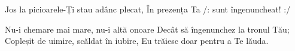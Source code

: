 \beginverse
Jos la picioarele-Ți stau adânc plecat,
În prezența Ta /: sunt îngenuncheat! :/
\endverse

\beginchorus
Nu-i chemare mai mare, nu-i altă onoare
Decât să îngenunchez la tronul Tău;
Copleșit de uimire, scăldat în iubire,
Eu trăiesc doar pentru a Te lăuda.
\endchorus
\endsong